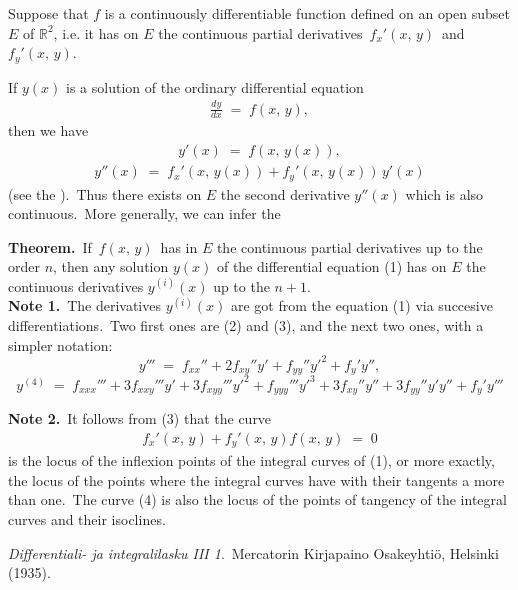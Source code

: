 \documentclass[12pt]{article}
\theoremstyle{definition}
\begin{document}

Suppose that $f$ is a continuously differentiable function defined on an open subset $E$ of $\mathbb{R}^2$, i.e. it has on $E$ the continuous partial derivatives \,$f_x'(x,\,y)$\, and\, $f_y'(x,\,y)$.

If $y(x)$ is a solution of the  ordinary differential equation
\begin{align}
\frac{dy}{dx} \;=\; f(x,\,y),
\end{align}
then we have
\begin{align}
y'(x) \;=\; f(x,\,y(x)), 
\end{align}
\begin{align}
y''(x) \;=\; f_x'(x,\,y(x))+f_y'(x,\,y(x))\,y'(x)
\end{align}
(see the ).\, Thus there exists on $E$ the second derivative $y''(x)$ which is also continuous.\, More generally, we can infer the

\textbf{Theorem.}\, If\, $f(x,\,y)$\, has in $E$ the continuous partial derivatives up to the order $n$, then any solution $y(x)$ of the differential equation (1) has on $E$ the continuous derivatives $y^{(i)}(x)$ up to the  $n\!+\!1$.\\

\textbf{Note 1.}\, The derivatives $y^{(i)}(x)$ are got from the equation (1) via succesive differentiations.\, Two first ones are (2) and (3), and the next two ones, with a simpler notation:
$$y''' \;=\; f_{xx}''+2f_{xy}''y'+f_{yy}''y'^2+f_y'y'',$$
$$y^{(4)} \;=\; f_{xxx}'''+3f_{xxy}'''y'+3f_{xyy}'''y'^2+f_{yyy}'''y'^3+3f_{xy}''y''+3f_{yy}''y'y''+f_y'y'''$$

\textbf{Note 2.}\, It follows from (3) that the curve
\begin{align}
f_x'(x,\,y)+f_y'(x,\,y)f(x,\,y) \;=\; 0
\end{align}
is the locus of the inflexion points of the integral curves of (1), or more exactly, the locus of the points where the integral curves have with their tangents a  more than one.\, The curve (4) is also the locus of the points of tangency of the integral curves and their isoclines.

\begin{thebibliography}{9}
 {\em Differentiali- ja integralilasku III 1}.\, Mercatorin Kirjapaino Osakeyhti\"o, Helsinki (1935).
\end{thebibliography}




\end{document}
